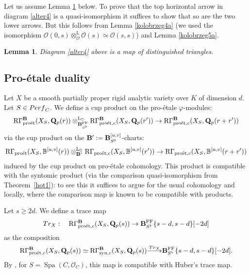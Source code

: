 \documentclass[10pt,reqno]{amsart}
\newtheorem{lemma}[equation]{Lemma}
\theoremstyle{definition}
\theoremstyle{remark}
\def\lomapr#1{\smash{\mathop{\relbar\joinrel\longrightarrow}\limits^{#1}}}
\def\phi{\varphi}
\newcommand{\proeet}{\operatorname{pro\acute{e}t} }
\newcommand{\Spa}{\operatorname{Spa} }
\newcommand{\synt}{ \operatorname{syn} }
\newcommand{\LL}{\operatorname{L} }
\newcommand{\FF}{\operatorname{FF} }
\newcommand{\so}{{\mathcal O}}
\numberwithin{equation}{section}
\def\R{{\mathrm R}}
\def\Q{{\bf Q}} \def\Z{{\bf Z}}
\numberwithin{equation}{section}
\begin{document}
 Let us assume Lemma \ref{tedious1} below. To prove that the top horizontal arrow  in diagram \ref{alter4} 
is a quasi-isomorphism it suffices to show that so are the two lower arrows. But this follows 
 from Lemma  \ref{kolobrzeg4a} (we used the isomorphism  $\so(0,s)\otimes^{\LL}_{\so}\so(s)\simeq \so(s,s)$) and  Lemma  \ref{kolobrzeg5a}. 
\begin{lemma}\label{tedious1}
Diagram \eqref{alter4} above is a map of distinguished triangles.
\end{lemma}
\subsection{Pro-\'etale duality}  Let $X$ be a smooth partially proper rigid analytic variety over $K$ of dimension $d$. Let $S\in {\rm Perf}_C$. 
We define  a cup product on the pro-\'etale
$\phi$-modules: 
\begin{equation}\label{cup11et}
  \R\Gamma^{\B}_{\proeet}(X_S,\Q_p(r))  \otimes^{\LL_{\Box}}_{\B^{\FF}_{S^{\flat}}}\R\Gamma^{\B}_{\proeet,c}(X_S,\Q_p(r^{\prime}))  \to \R\Gamma^{\B}_{\proeet,c}(X_S,\Q_p(r+r^{\prime}))
\end{equation}
via the cup product on the ${\bf B}^{\prime}:={\bf B}_{S^{\flat}}^{[u,v]}$-charts:
$$
  \R\Gamma_{\proeet}(X_S,{\mathbb B}^{[u,v]}(r))  \otimes^{\LL_{\Box}}_{\B^{\prime}}\R\Gamma_{\proeet,c}(X_S,{\mathbb B}^{[u,v]}(r^{\prime}))  \to \R\Gamma_{\proeet,c}(X_S,{\mathbb B}^{[u,v]}(r+r^{\prime}))
$$
induced by the cup product on pro-\'etale cohomology. 
This product is compatible with the syntomic product  (via the comparison quasi-isomorphism from Theorem~\ref{hot1}): to see this it suffices to argue for the usual cohomology and locally, where the comparison map is known to be compatible with products.
  
     Let $s\geq 2d$. We define  a trace map
 \begin{equation}\label{trace11et}
 {\rm Tr}_X: \quad   \R\Gamma^{\B}_{\proeet,c}(X_S,\Q_p(s))\to \B^{\FF}_{S^{\flat}}\{s-d,s-d\}[-2d]
\end{equation}
  as the composition
 $$
  \R\Gamma^{\B}_{\proeet,c}(X_S,\Q_p(s)) \simeq  \R\Gamma^{\B}_{\synt,c}(X_S,\Q_p(s))\lomapr{{\rm Tr}_X} \B^{\FF}_{S^{\flat}}\{s-d,s-d\}[-2d].
 $$
By \cite[Prop.\,7.17]{AGN}, for $S=\Spa(C,\so_C)$, this map is compatible with  Huber's trace map. 
\end{document}
